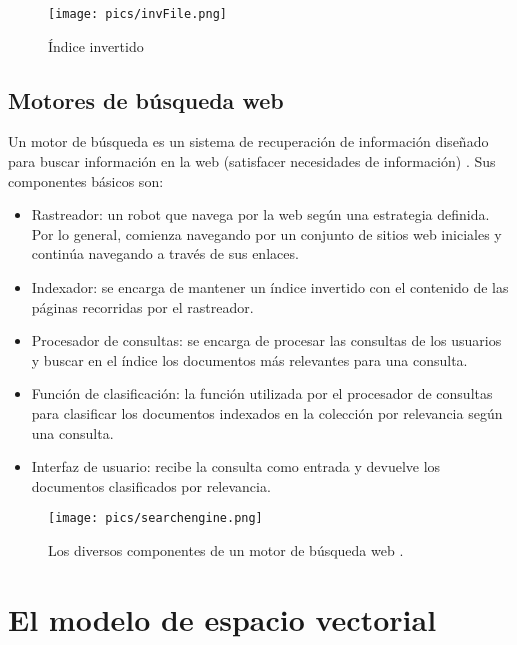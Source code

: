 \begin{figure}[h!]
\centering
\texttt{[image: pics/invFile.png]}
\caption{Índice invertido}
\end{figure}

\subsection{Motores de búsqueda web}

Un motor de búsqueda es un sistema de recuperación de información diseñado para buscar información en la web (satisfacer necesidades de información) \cite{manning2008}. Sus componentes básicos son:

\begin{itemize}
\item Rastreador: un robot que navega por la web según una estrategia definida. Por lo general, comienza navegando por un conjunto de sitios web iniciales y continúa navegando a través de sus enlaces.
\item Indexador: se encarga de mantener un índice invertido con el contenido de las páginas recorridas por el rastreador.
\item Procesador de consultas: se encarga de procesar las consultas de los usuarios y buscar en el índice los documentos más relevantes para una consulta.
\item Función de clasificación: la función utilizada por el procesador de consultas para clasificar los documentos indexados en la colección por relevancia según una consulta.
\item Interfaz de usuario: recibe la consulta como entrada y devuelve los documentos clasificados por relevancia.
\end{itemize}

\begin{figure}[h!]
\centering
\texttt{[image: pics/searchengine.png]}
\caption{Los diversos componentes de un motor de búsqueda web \cite{manning2008}.}
\end{figure}
\section{El modelo de espacio vectorial}

